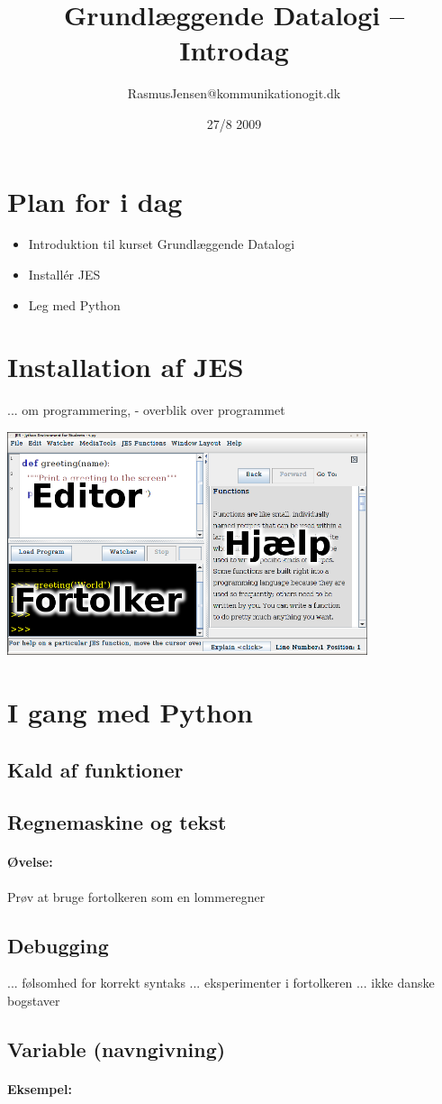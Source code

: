 \documentclass[10pt]{article}
\title{Grundlæggende Datalogi -- Introdag}
\author{RasmusJensen@kommunikationogit.dk}
\date{27/8 2009}
\begin{document}
\maketitle

\section{Plan for i dag}
\begin{itemize}
\item Introduktion til kurset Grundlæggende Datalogi
\item Installér JES
\item Leg med Python
\end{itemize}

\section{Installation af JES}
... om programmering, 
-
overblik over programmet
\begin{center}
\includegraphics[width=300pt]{JESdesc.png}
\end{center}
\section{I gang med Python}
\subsection{Kald af funktioner}

\subsection{Regnemaskine og tekst}
\paragraph{Øvelse:} Prøv at bruge fortolkeren som en lommeregner
\subsection{Debugging}
... følsomhed for korrekt syntaks
... eksperimenter i fortolkeren
... ikke danske bogstaver
\subsection{Variable (navngivning)}
\paragraph{Eksempel:} 



\end{document}
